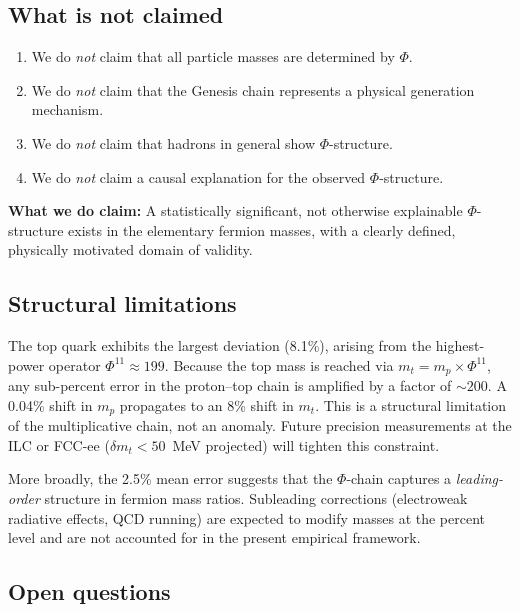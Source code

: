 \documentclass[11pt,a4paper]{article}
\begin{document}
\subsection{What is not claimed}
\label{sec:nonclaims}

\begin{enumerate}
  \item We do \emph{not} claim that all particle masses are
        determined by $\Phi$.
  \item We do \emph{not} claim that the Genesis chain represents a
        physical generation mechanism.
  \item We do \emph{not} claim that hadrons in general show
        $\Phi$-structure.
  \item We do \emph{not} claim a causal explanation for the observed
        $\Phi$-structure.
\end{enumerate}

\noindent
\textbf{What we do claim:} A statistically significant, not
otherwise explainable $\Phi$-structure exists in the elementary
fermion masses, with a clearly defined, physically motivated domain
of validity.

\subsection{Structural limitations}
\label{sec:limitations}

The top quark exhibits the largest deviation (8.1\%), arising from
the highest-power operator $\Phi^{11} \approx 199$. Because the
top mass is reached via $m_t = m_p \times \Phi^{11}$, any sub-percent
error in the proton--top chain is amplified by a factor of $\sim 200$.
A 0.04\% shift in $m_p$ propagates to an 8\% shift in $m_t$. This is a
structural limitation of the multiplicative chain, not an anomaly.
Future precision measurements at the ILC or FCC-ee
($\delta m_t < 50$~MeV projected) will tighten this constraint.

More broadly, the 2.5\% mean error suggests that the $\Phi$-chain
captures a \emph{leading-order} structure in fermion mass ratios.
Subleading corrections (electroweak radiative effects, QCD running)
are expected to modify masses at the percent level and are not
accounted for in the present empirical framework.

\subsection{Open questions}
\label{sec:open}
\end{document}
